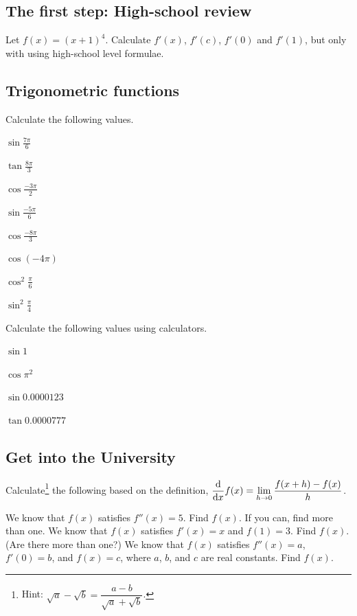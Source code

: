 \documentclass[11pt,pdfa,lastpage]{MishoNote}
\begin{document}
\subsection{The first step: High-school review}
\begin{enumerate}[start=14]
  \itemB Let $f(x)=(x+1)^4$. Calculate $f'(x)$, $f'(c)$, $f'(0)$ and $f'(1)$, but only with using high-school level formulae.
\end{enumerate}

\subsection{Trigonometric functions}

\begin{enumerate}[resume]
  \itemA Calculate the following values.
  \begin{menumerate}{4}
    \item $\displaystyle\sin\frac{7\pi}6$
    \item $\displaystyle\tan\frac{8\pi}3$
    \item $\displaystyle\cos\frac{-3\pi}2$
    \item $\displaystyle\sin\frac{-5\pi}6$
    \item $\displaystyle\cos\frac{-8\pi}3$
    \item $\cos(-4\pi)$
    \item $\displaystyle\cos^2\frac\pi6$
    \item $\displaystyle\sin^2\frac\pi4$
  \end{menumerate}
  \itemA Calculate the following values using calculators.
  \begin{menumerate}{4}
    \item $\sin1$
    \item $\cos\pi^2$
    \item $\sin0.0000123$
    \item $\tan0.0000777$
   \end{menumerate}
\end{enumerate}

\subsection{Get into the University}
\begin{enumerate}[resume]
  \itemC Calculate\footnote{Hint: $\sqrt{a}-\sqrt{b}=\dfrac{a-b}{\sqrt{a}+\sqrt{b}}$.}
  the following based on the definition,
  $\displaystyle\diff{}{x}f(x)=\lim_{h\to 0}\frac{f(x+h)-f(x)}{h}$.
  \begin{menumerate}{3}
  \end{menumerate}
  \bigskip

  \itemA We know that $f(x)$ satisfies $f''(x)=5$. Find $f(x)$. If you can, find more than one.
  \itemB We know that $f(x)$ satisfies $f'(x)=x$ and $f(1)=3$. Find $f(x)$. (Are there more than one?)
  \itemC We know that $f(x)$ satisfies $f''(x)=a$, $f'(0)=b$, and $f(x)=c$, where $a$, $b$, and $c$ are real constants. Find $f(x)$.
\end{enumerate}
\end{document}
